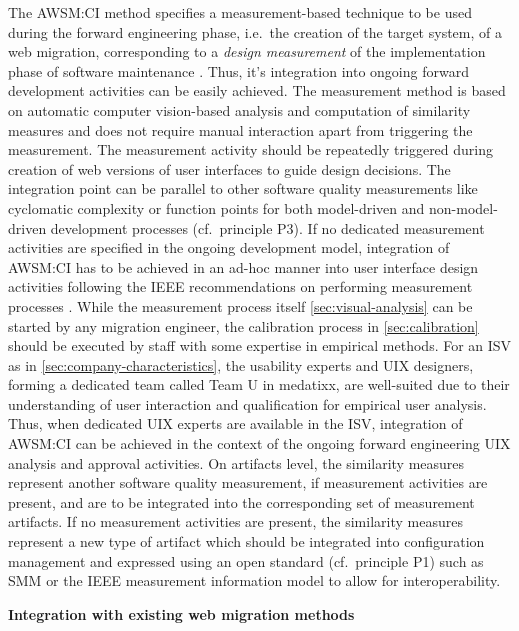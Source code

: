 The AWSM:CI method specifies a measurement-based technique to be used during the forward engineering phase, i.e.~the creation of the target system, of a web migration, corresponding to a \emph{design measurement} of the implementation phase of software maintenance \autocite{IEEE1219Maintenance}.
Thus, it's integration into ongoing forward development activities can be easily achieved.
The measurement method is based on automatic computer vision-based analysis and computation of similarity measures and does not require manual interaction apart from triggering the measurement.
The measurement activity should be repeatedly triggered during creation of web versions of user interfaces to guide design decisions.
The integration point can be parallel to other software quality measurements \autocite{SWEBOK2014,Wallmueller2001SoftwareQuality} like cyclomatic complexity or function points \autocite{Kan1996Metrics} for both model-driven and non-model-driven development processes (cf.~principle P3).
If no dedicated measurement activities are specified in the ongoing development model, integration of AWSM:CI has to be achieved in an ad-hoc manner into user interface design activities following the IEEE recommendations on performing measurement processes \autocite{SWEBOK2014}.
While the measurement process itself \cref{sec:visual-analysis} can be started by any migration engineer, the calibration process in \cref{sec:calibration} should be executed by staff with some expertise in empirical methods.
For an ISV as in \cref{sec:company-characteristics}, the usability experts and UIX designers, forming a dedicated team called Team U in medatixx, are well-suited due to their understanding of user interaction and qualification for empirical user analysis.
Thus, when dedicated UIX experts are available in the ISV, integration of AWSM:CI can be achieved in the context of the ongoing forward engineering UIX analysis and approval activities.
On artifacts level, the similarity measures represent another software quality measurement, if measurement activities are present, and are to be integrated into the corresponding set of measurement artifacts.
If no measurement activities are present, the similarity measures represent a new type of artifact which should be integrated into configuration management and expressed using an open standard (cf.~principle P1) such as SMM \autocite{OMG2012SMM} or the IEEE measurement information model \autocite{ISO/IEEE2017Measurement} to allow for interoperability.

\textbf{Integration with existing web migration methods}

